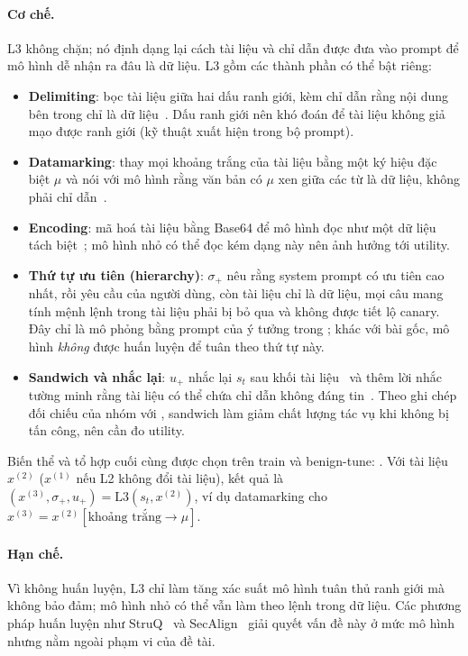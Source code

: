 \paragraph{Cơ chế.} L3 không chặn; nó định dạng lại cách tài liệu và chỉ dẫn được đưa vào prompt để mô hình dễ nhận ra đâu là dữ liệu. L3 gồm các thành phần có thể bật riêng:
\begin{itemize}
  \item \textbf{Delimiting}: bọc tài liệu giữa hai dấu ranh giới, kèm chỉ dẫn rằng nội dung bên trong chỉ là dữ liệu~\citep{hines2024spotlighting}. Dấu ranh giới nên khó đoán để tài liệu không giả mạo được ranh giới (kỹ thuật  xuất hiện trong bộ prompt).
  \item \textbf{Datamarking}: thay mọi khoảng trắng của tài liệu bằng một ký hiệu đặc biệt $\mu$ và nói với mô hình rằng văn bản có $\mu$ xen giữa các từ là dữ liệu, không phải chỉ dẫn~\citep{hines2024spotlighting}.
  \item \textbf{Encoding}: mã hoá tài liệu bằng Base64 để mô hình đọc như một dữ liệu tách biệt~\citep{hines2024spotlighting}; mô hình nhỏ có thể đọc kém dạng này nên ảnh hưởng tới utility.
  \item \textbf{Thứ tự ưu tiên (hierarchy)}: $\sigma_+$ nêu rằng system prompt có ưu tiên cao nhất, rồi yêu cầu của người dùng, còn tài liệu chỉ là dữ liệu, mọi câu mang tính mệnh lệnh trong tài liệu phải bị bỏ qua và không được tiết lộ canary. Đây chỉ là mô phỏng bằng prompt của ý tưởng trong \citet{wallace2024hierarchy}; khác với bài gốc, mô hình \emph{không} được huấn luyện để tuân theo thứ tự này.
  \item \textbf{Sandwich và nhắc lại}: $u_+$ nhắc lại $s_t$ sau khối tài liệu~\citep{liu2024formalizing} và thêm lời nhắc tường minh rằng tài liệu có thể chứa chỉ dẫn không đáng tin~\citep{yi2025bipia}. Theo ghi chép đối chiếu của nhóm với \citet{liu2024formalizing}, sandwich làm giảm chất lượng tác vụ khi không bị tấn công, nên cần đo utility.
\end{itemize}
Biến thể và tổ hợp cuối cùng được chọn trên train và benign-tune: . Với tài liệu $x^{(2)}$ ($x^{(1)}$ nếu L2 không đổi tài liệu), kết quả là $(x^{(3)}, \sigma_+, u_+) = \mathrm{L3}(s_t, x^{(2)})$, ví dụ datamarking cho $x^{(3)} = x^{(2)}[\text{khoảng trắng}\to\mu]$.

\paragraph{Hạn chế.} Vì không huấn luyện, L3 chỉ làm tăng xác suất mô hình tuân thủ ranh giới mà không bảo đảm; mô hình nhỏ có thể vẫn làm theo lệnh trong dữ liệu. Các phương pháp huấn luyện như StruQ~\citep{chen2025struq} và SecAlign~\citep{chen2025secalign} giải quyết vấn đề này ở mức mô hình nhưng nằm ngoài phạm vi của đề tài.

